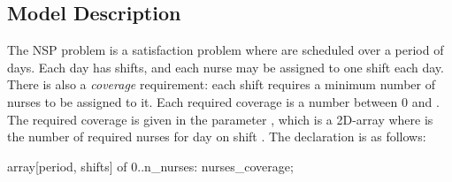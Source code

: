 \documentclass[a4paper,12pt]{article}
\begin{document}
\subsection{Model Description}\label{sec:nsp:desc}
The NSP problem is a satisfaction problem where  are scheduled over a
period of  days. Each day has  shifts, and each nurse may be
assigned to one shift each day. There is also a \emph{coverage} requirement: each shift
requires a minimum number of nurses to be assigned to it. Each required coverage is
a number between 0 and . The required coverage is given in the parameter
, which is a 2D-array where  is the number of
required nurses for day  on shift .
The declaration is as follows:
\begin{mznnobreak}
array[period, shifts] of 0..n_nurses: nurses_coverage;
\end{mznnobreak}
%
\end{document}
